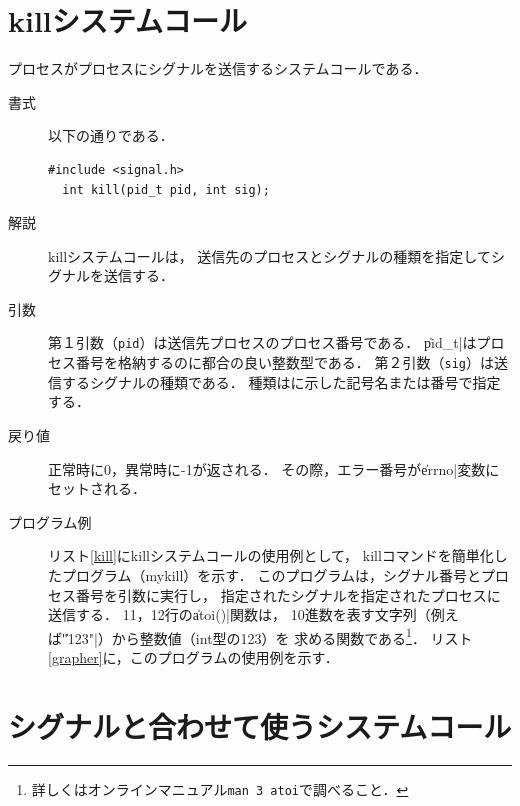 \section{killシステムコール}
プロセスがプロセスにシグナルを送信するシステムコールである．

\begin{description}
\item[書式] 以下の通りである．
\begin{lstlisting}[numbers=none]
  #include <signal.h>
  int kill(pid_t pid, int sig);
\end{lstlisting}

\item[解説]
  killシステムコールは，
  送信先のプロセスとシグナルの種類を指定してシグナルを送信する．

\item[引数]
  第１引数（\texttt{pid}）は送信先プロセスのプロセス番号である．
  \|pid_t|はプロセス番号を格納するのに都合の良い整数型である．
  第２引数（\texttt{sig}）は送信するシグナルの種類である．
  種類はに示した記号名または番号で指定する．

\item[戻り値]
  正常時に0，異常時に-1が返される．
  その際，エラー番号が\|errno|変数にセットされる．

\item[プログラム例]
  リスト\ref{kill}にkillシステムコールの使用例として，
  killコマンドを簡単化したプログラム（mykill）を示す．
  このプログラムは，シグナル番号とプロセス番号を引数に実行し，
  指定されたシグナルを指定されたプロセスに送信する．
  11，12行の\|atoi()|関数は，
  10進数を表す文字列（例えば\|"123"|）から整数値（int型の123）を
  求める関数である\footnote{
    詳しくはオンラインマニュアル\texttt{man 3 atoi}で調べること．}．
  リスト\ref{grapher}に，このプログラムの使用例を示す．





\end{description}

\section{シグナルと合わせて使うシステムコール}

